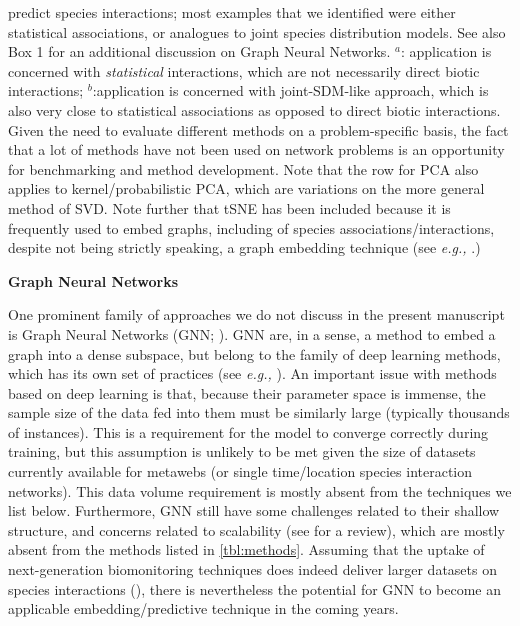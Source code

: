 \begin{refsection}
\begin{table}[h]
{predict species interactions; most examples that we identified were
either statistical associations, or analogues to joint species
distribution models. See also Box 1 for an additional discussion on Graph Neural Networks. \(^a\): application is concerned with
\emph{statistical} interactions, which are not necessarily direct
biotic interactions; \(^b\):application is concerned with joint-SDM-like
approach, which is also very close to statistical associations as
opposed to direct biotic interactions. Given the need to evaluate
different methods on a problem-specific basis, the fact that a lot of
methods have not been used on network problems is an opportunity for
benchmarking and method development. Note that the row for PCA also
applies to kernel/probabilistic PCA, which are variations on the more
general method of SVD. Note further that tSNE has been included because
it is frequently used to embed graphs, including of species
associations/interactions, despite not being strictly speaking, a graph
embedding technique (see \emph{e.g.,} \cite{Chami2022Machine}.)}
\label{tbl:methods}
\end{table}

\clearpage

\begin{summary}
\textbf{Graph Neural Networks}

One prominent family of approaches we do not discuss in the present
manuscript is Graph Neural Networks (GNN; \cite{Zhou2020Graph}). GNN are,
in a sense, a method to embed a graph into a dense subspace, but belong
to the family of deep learning methods, which has its own set of
practices (see \emph{e.g.,} \cite{Goodfellow2016Deep}). An important issue with
methods based on deep learning is that, because their parameter space is
immense, the sample size of the data fed into them must be similarly
large (typically thousands of instances). This is a requirement for the
model to converge correctly during training, but this assumption is
unlikely to be met given the size of datasets currently available for
metawebs (or single time/location species interaction networks). This
data volume requirement is mostly absent from the techniques we list
below. Furthermore, GNN still have some challenges related to their
shallow structure, and concerns related to scalability (see
\cite{Gupta2021Graph} for a review), which are mostly absent from the
methods listed in \autoref{tbl:methods}. Assuming that the uptake of
next-generation biomonitoring techniques does indeed deliver larger
datasets on species interactions (\cite{Bohan2017Nextgeneration}), there
is nevertheless the potential for GNN to become an applicable
embedding/predictive technique in the coming years.
\end{summary}


\end{refsection}
